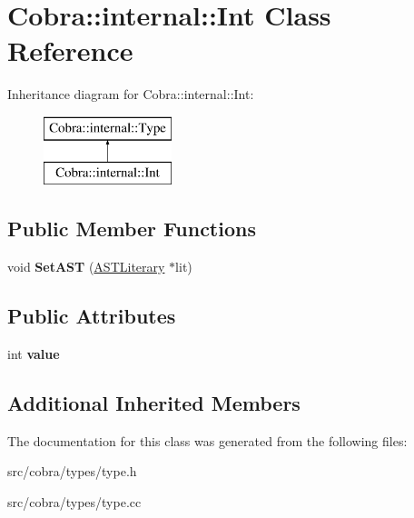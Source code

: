 \hypertarget{class_cobra_1_1internal_1_1_int}{\section{Cobra\+:\+:internal\+:\+:Int Class Reference}
\label{class_cobra_1_1internal_1_1_int}
}
Inheritance diagram for Cobra\+:\+:internal\+:\+:Int\+:\begin{figure}[H]
\begin{center}
\leavevmode
\includegraphics[height=2.000000cm]{class_cobra_1_1internal_1_1_int}
\end{center}
\end{figure}
\subsection*{Public Member Functions}
\begin{DoxyCompactItemize}
\item 
\hypertarget{class_cobra_1_1internal_1_1_int_a88c0203999937840078aad33d6f7fca8}{void {\bfseries Set\+A\+S\+T} (\hyperlink{class_cobra_1_1internal_1_1_a_s_t_literary}{A\+S\+T\+Literary} $\ast$lit)}\label{class_cobra_1_1internal_1_1_int_a88c0203999937840078aad33d6f7fca8}

\end{DoxyCompactItemize}
\subsection*{Public Attributes}
\begin{DoxyCompactItemize}
\item 
\hypertarget{class_cobra_1_1internal_1_1_int_a1a916052e60d1c95c9c26e94159e0633}{int {\bfseries value}}\label{class_cobra_1_1internal_1_1_int_a1a916052e60d1c95c9c26e94159e0633}

\end{DoxyCompactItemize}
\subsection*{Additional Inherited Members}


The documentation for this class was generated from the following files\+:\begin{DoxyCompactItemize}
\item 
src/cobra/types/type.\+h\item 
src/cobra/types/type.\+cc\end{DoxyCompactItemize}
